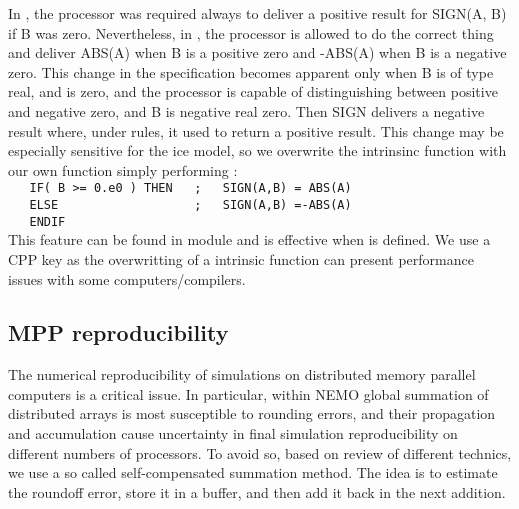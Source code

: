 \documentclass[../main/NEMO_manual]{subfiles}
\begin{document}
In \fninety, the processor was required always to deliver a positive result for SIGN(A, B) if B was zero.
Nevertheless, in \fninety, the processor is allowed to do the correct thing and deliver ABS(A) when
B is a positive zero and -ABS(A) when B is a negative zero.
This change in the specification becomes apparent only when B is of type real, and is zero,
and the processor is capable of distinguishing between positive and negative zero,
and B is negative real zero.
Then SIGN delivers a negative result where, under \fninety rules, it used to return a positive result.
This change may be especially sensitive for the ice model,
so we overwrite the intrinsinc function with our own function simply performing :   \\
\verb?   IF( B >= 0.e0 ) THEN   ;   SIGN(A,B) = ABS(A)  ?    \\
\verb?   ELSE                   ;   SIGN(A,B) =-ABS(A)     ?  \\
\verb?   ENDIF    ? \\
This feature can be found in  module and is effective when  is defined.
We use a CPP key as the overwritting of a intrinsic function can present performance issues with
some computers/compilers.


\subsection{MPP reproducibility}
\label{subsec:MISC_glosum}

The numerical reproducibility of simulations on distributed memory parallel computers is a critical issue.
In particular, within NEMO global summation of distributed arrays is most susceptible to rounding errors,
and their propagation and accumulation cause uncertainty in final simulation reproducibility on
different numbers of processors.
To avoid so, based on \citet{He_Ding_JSC01} review of different technics,
we use a so called self-compensated summation method.
The idea is to estimate the roundoff error, store it in a buffer, and then add it back in the next addition. 
\end{document}
